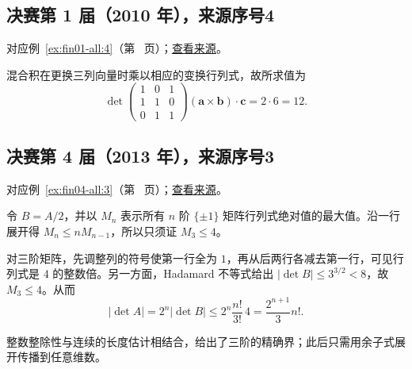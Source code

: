 \documentclass[12pt,fontset=fandol]{ctexart}
\begin{document}
\subsection{决赛第 1 届（2010 年），来源序号4}\label{ans:fin01-all:4}\label{pr:fin01-all:4}

对应例~\ref{ex:fin01-all:4}（第~\pageref{ex:fin01-all:4} 页）；\href{https://github.com/lzxcr/cmc-mathematics/blob/64916fa1fdbc3e444a652eca204d5669058ee321/src/problems/finals/01/04.md}{查看来源}。

\begin{solve}

混合积在更换三列向量时乘以相应的变换行列式，故所求值为
\[
\det\begin{pmatrix}1&0&1\\1&1&0\\0&1&1\end{pmatrix}
(\boldsymbol a\times\boldsymbol b)\cdot\boldsymbol c
=2\cdot6=12.
\]

\end{solve}

\subsection{决赛第 4 届（2013 年），来源序号3}\label{ans:fin04-all:3}\label{pr:fin04-all:3}

对应例~\ref{ex:fin04-all:3}（第~\pageref{ex:fin04-all:3} 页）；\href{https://github.com/lzxcr/cmc-mathematics/blob/64916fa1fdbc3e444a652eca204d5669058ee321/src/problems/finals/04/03.md}{查看来源}。

\begin{solve}

令 $B=A/2$，并以 $M_n$ 表示所有 $n$ 阶 $\{\pm1\}$ 矩阵行列式绝对值的最大值。沿一行展开得 $M_n\le nM_{n-1}$，所以只须证 $M_3\le4$。

对三阶矩阵，先调整列的符号使第一行全为 $1$，再从后两行各减去第一行，可见行列式是 $4$ 的整数倍。另一方面，Hadamard 不等式给出
$|\det B|\le3^{3/2}<8$，故 $M_3\le4$。从而
\[
|\det A|=2^n|\det B|\le2^n\frac{n!}{3!}\,4
=\frac{2^{n+1}}3n!.
\]

\end{solve}

\begin{remark}[方法与条件]

整数整除性与连续的长度估计相结合，给出了三阶的精确界；此后只需用余子式展开传播到任意维数。

\end{remark}
\end{document}

